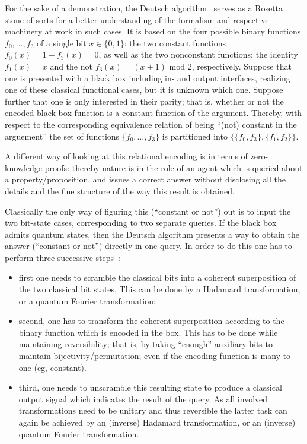 \documentclass[runningheads]{llncs}
\begin{document}
For the sake of a demonstration, the Deutsch algorithm~\cite[Chapter~2]{mermin-07} serves as a Rosetta stone of sorts
for a better understanding of the formalism and respective machinery at work in such cases.
It is based on the four possible binary functions $f_0, \ldots , f_3$ of a single bit $x \in \{0,1\}$:
the two constant functions $f_0(x)=1-f_3(x)=0$,
as well as the two nonconstant functions: the identity $f_1(x)=x$ and the not $f_3(x) = (x+1) \text{ mod } 2$, respectively.
Suppose that one is presented with a black box including in- and output interfaces,
realizing one of these classical functional cases, but it is unknown which one.
Suppose further that one is only interested in their parity; that is, whether or not the encoded black box function is a constant function of the argument.
Thereby, with respect to the corresponding equivalence relation of being ``(not) constant in the arguement''
the set of functions
$\{f_0, \ldots , f_3\}$
is partitioned into
$\{\{f_0,f_3\},\{f_1,f_2\}\}$.

A different way of looking at this relational encoding
is in terms of zero-knowledge proofs: thereby
nature is in the role of an agent
which is queried about a property/proposition, and issues a correct answer
without disclosing
all the details and the fine structure of the way this result is obtained.

Classically the only way of figuring this (``constant or not'')   out
is to input the two bit-state cases, corresponding to two separate queries.
If the black box admits quantum states,
then the Deutsch algorithm presents a way to obtain the answer (``constant or not'')
directly in one query.
In order to do this one has to perform
three successive steps~\cite{svozil-2005-ko,2007-tkadlec-svozil-springer}:
\begin{itemize}
\item
first one needs to scramble the classical bits into a coherent superposition of the two classical bit states.
This can be done by a Hadamard transformation, or a quantum Fourier transformation;
\item
second, one has to transform the coherent superposition according to the binary function which is encoded in the box.
This has to be done while maintaining reversibility; that is, by taking ``enough'' auxiliary bits
to maintain bijectivity/permutation; even if the encoding function is many-to-one (eg, constant).
\item
third, one needs to unscramble this resulting state to produce a classical output signal which indicates the result of the query.
As all involved transformations need to be unitary and thus reversible
the latter task can again be achieved by an (inverse) Hadamard transformation, or an (inverse)
quantum Fourier transformation.
\end{itemize}
\end{document}
